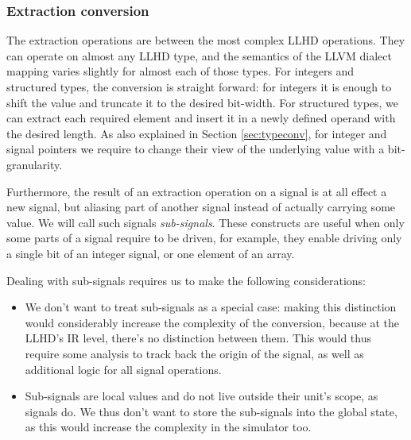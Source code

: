 

\subsubsection{Extraction conversion}
\label{sec:extrs}
The extraction operations are between the most complex LLHD operations. They can operate on almost any LLHD type, and the semantics of the LLVM dialect mapping varies slightly for almost each of those types. For integers and structured types, the conversion is straight forward: for integers it is enough to shift the value and truncate it to the desired bit-width. For structured types, we can extract each required element and insert it in a newly defined operand with the desired length. As also explained in Section \ref{sec:typeconv}, for integer and signal pointers we require to change their view of the underlying value with a bit-granularity.

Furthermore, the result of an extraction operation on a signal is at all effect a new signal, but aliasing part of another signal instead of actually carrying some value. We will call such signals \textit{sub-signals}. These constructs are useful when only some parts of a signal require to be driven, for example, they enable driving only a single bit of an integer signal, or one element of an array.

Dealing with sub-signals requires us to make the following considerations:
\begin{itemize}
    \item We don't want to treat sub-signals as a special case: making this distinction would considerably increase the complexity of the conversion, because at the LLHD's IR level, there's no distinction between them. This would thus require some analysis to track back the origin of the signal, as well as additional logic for all signal operations.
    \item Sub-signals are local values and do not live outside their unit's scope, as signals do. We thus don't want to store the sub-signals into the global state, as this would increase the complexity in the simulator too.
\end{itemize}

